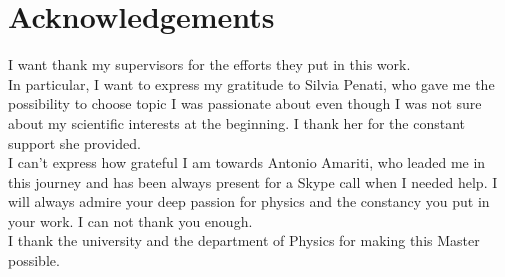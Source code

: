 

\chapter*{Acknowledgements}

I want thank my supervisors for the efforts they put in this work.\\
In particular, I want to express my gratitude to Silvia Penati, who gave me the possibility to choose topic I was passionate about even though I was not sure about my scientific interests at the beginning. 
I thank her for the constant support she provided.
\\
I can't express how grateful I am towards Antonio Amariti, who leaded me in this journey and has been always present for a Skype call when I needed help.
I will always admire your deep passion for physics and the constancy you put in your work.  I can not thank you enough.
\\
I thank the university and the department of Physics for making this Master possible.

